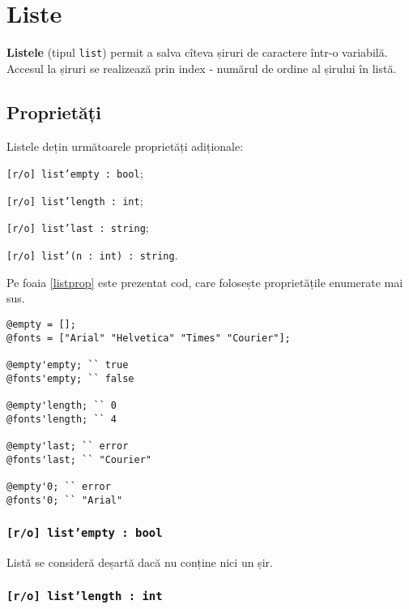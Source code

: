 \section{Liste}

{\bf Listele} (tipul \texttt{list}) permit a salva cîteva șiruri de caractere într-o variabilă. Accesul la șiruri se realizează prin index - numărul de ordine al șirului în listă.

\subsection{Proprietăți}

Listele dețin următoarele proprietăți adiționale:
\begin{icItems}
\item
	\texttt{[r/o] list'empty : bool};
\item
	\texttt{[r/o] list'length : int};
\item
	\texttt{[r/o] list'last : string};
\item
	\texttt{[r/o] list'(n : int) : string}.
\end{icItems}

Pe foaia \ref{listprop} este prezentat cod, care folosește proprietățile enumerate mai sus.

\begin{sourcecode}
\label{listprop}
\begin{verbatim}
@empty = [];
@fonts = ["Arial" "Helvetica" "Times" "Courier"];

@empty'empty; `` true
@fonts'empty; `` false

@empty'length; `` 0
@fonts'length; `` 4

@empty'last; `` error
@fonts'last; `` "Courier"

@empty'0; `` error
@fonts'0; `` "Arial"
\end{verbatim}
\end{sourcecode}

\subsubsection{\texttt{[r/o] list'empty : bool}}

Listă se consideră deșartă dacă nu conține nici un șir.

\subsubsection{\texttt{[r/o] list'length : int}}

